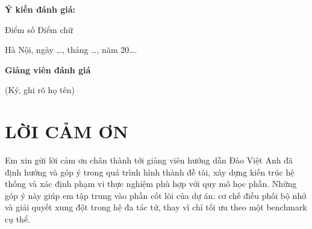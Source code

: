 \documentclass[12pt,a4paper]{article}
\begin{document}
\newpage
\thispagestyle{empty}
\noindent\textbf{Ý kiến đánh giá:}

\vspace{0.3cm}
\noindent\dotfill\par\vspace{0.35cm}
\noindent\dotfill\par\vspace{0.35cm}
\noindent\dotfill\par\vspace{0.35cm}
\noindent\dotfill\par\vspace{0.35cm}
\noindent\dotfill\par\vspace{0.35cm}
\noindent\dotfill\par\vspace{0.35cm}
\noindent\dotfill\par\vspace{0.35cm}
\noindent\dotfill\par\vspace{0.35cm}
\noindent\dotfill\par\vspace{0.35cm}
\noindent\dotfill\par

\vspace{1.0cm}
\noindent Điểm số \dotfill \hspace{1.5cm} Điểm chữ \dotfill

\vspace{1.0cm}
\begin{flushright}
Hà Nội, ngày \ldots, tháng \ldots, năm 20\ldots .
\end{flushright}

\vspace{1.0cm}
\begin{flushright}
\textbf{Giảng viên đánh giá}\par
(Ký, ghi rõ họ tên)
\end{flushright}

\newpage
\section*{LỜI CẢM ƠN}

Em xin gửi lời cảm ơn chân thành tới giảng viên hướng dẫn Đào Việt Anh đã định hướng và góp ý trong quá trình hình thành đề tài, xây dựng kiến trúc hệ thống và xác định phạm vi thực nghiệm phù hợp với quy mô học phần. Những góp ý này giúp em tập trung vào phần cốt lõi của dự án: cơ chế điều phối bộ nhớ và giải quyết xung đột trong hệ đa tác tử, thay vì chỉ tối ưu theo một benchmark cụ thể.
\end{document}

